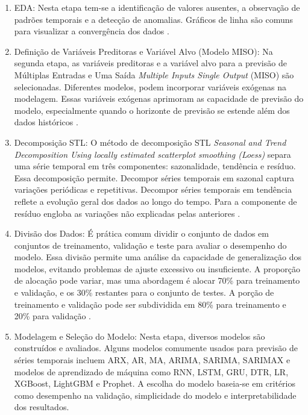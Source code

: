 \begin{enumerate}
	
	\item {EDA}: Nesta etapa  tem-se a identificação de valores ausentes, a observação de padrões temporais e a detecção de anomalias. Gráficos de linha são comuns para visualizar a convergência dos dados \cite{Rostam2021108249}.
	
	\item {Definição de Variáveis Preditoras e Variável Alvo (Modelo MISO)}: Na segunda etapa, as variáveis preditoras e a variável alvo para a previsão de Múltiplas Entradas e Uma Saída \textit{Multiple Inputs Single Output} (MISO) são selecionadas. Diferentes modelos, podem incorporar variáveis exógenas na modelagem. Essas variáveis exógenas aprimoram as capacidade de previsão do modelo, especialmente quando o horizonte de previsão se estende além dos dados históricos \cite{PAWLOWSKI202298}. 
	
	\item {Decomposição STL}: O método de decomposição STL \textit{Seasonal and Trend Decomposition Using locally estimated scatterplot smoothing (Loess)} separa uma série temporal em três componentes: sazonalidade, tendência e resíduo. Essa decomposição permite. Decompor séries temporais em sazonal captura variações periódicas e repetitivas. Decompor séries temporais em tendência reflete a evolução geral dos dados ao longo do tempo. Para a componente de resíduo engloba as variações não explicadas pelas anteriores \cite{Bandara2021}.
	
	\item {Divisão dos Dados}: É prática comum dividir o conjunto de dados em conjuntos de treinamento, validação e teste para avaliar o desempenho do modelo. Essa divisão permite uma análise da capacidade de generalização dos modelos, evitando problemas de ajuste excessivo ou insuficiente. A proporção de alocação pode variar, mas uma abordagem é alocar 70\% para treinamento e validação, e os 30\% restantes para o conjunto de testes. A porção de treinamento e validação pode ser subdividida em 80\% para treinamento e 20\% para validação \cite{Tao2020}.
	
	\item {Modelagem e Seleção do Modelo}: Nesta etapa, diversos modelos são construídos e avaliados. Alguns modelos comumente usados para previsão de séries temporais incluem ARX, AR, MA, ARIMA, SARIMA, SARIMAX  e modelos de aprendizado de máquina como RNN, LSTM, GRU, DTR, LR, XGBoost, LightGBM e Prophet. A escolha do modelo baseia-se em critérios como desempenho na validação, simplicidade do modelo e interpretabilidade dos resultados.
	

\end{enumerate}
